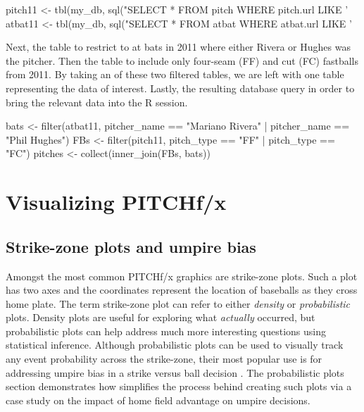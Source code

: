 \documentclass[a4paper]{report}\usepackage[]{graphicx}\usepackage[]{color}
\begin{document}
\begin{article}
\begin{Schunk}
\begin{Sinput}
pitch11 <- tbl(my_db, sql("SELECT * FROM pitch WHERE pitch.url LIKE '%
atbat11 <- tbl(my_db, sql("SELECT * FROM atbat WHERE atbat.url LIKE '%
\end{Sinput}
\end{Schunk}


Next,  the  table to restrict to at bats
in 2011 where either Rivera or Hughes was the pitcher. Then 
the  table to include only four-seam (FF) and cut (FC)
fastballs from 2011. By taking an  of these two
filtered tables, we are left with one table representing the data
of interest. Lastly,  the resulting database query
in order to bring the relevant data into the R session.

\begin{Schunk}
\begin{Sinput}
bats <- filter(atbat11, 
  pitcher_name == "Mariano Rivera" | pitcher_name == "Phil Hughes")
FBs <- filter(pitch11, pitch_type == "FF" | pitch_type == "FC")
pitches <- collect(inner_join(FBs, bats))
\end{Sinput}
\end{Schunk}



\section{Visualizing PITCHf/x}


\subsection{Strike-zone plots and umpire bias}

Amongst the most common PITCHf/x graphics are strike-zone plots. Such
a plot has two axes and the coordinates represent the location of
baseballs as they cross home plate. The term strike-zone plot can
refer to either \emph{density} or \emph{probabilistic} plots. Density
plots are useful for exploring what \emph{actually} occurred, but
probabilistic plots can help address much more interesting questions
using statistical inference. Although probabilistic plots can be used
to visually track any event probability across the strike-zone, their
most popular use is for addressing umpire bias in a strike versus
ball decision \citet{bias}. The probabilistic plots section demonstrates
how  simplifies the process behind creating such plots
via a case study on the impact of home field advantage on umpire decisions.


\end{article}
\end{document}
